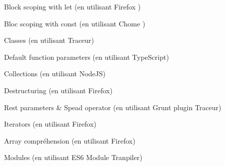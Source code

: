 \begin{list}{•}{•}
  
  \item 
  Block scoping with let (en utilisant Firefox )
  \item
  Bloc scoping with const (en utilisant Chome )
  \item
  Classes (en utilisant Traceur)
  \item
  Default function parameters (en utilisant TypeScript)
  \item
  Collections (en utilisant NodeJS)
  \item
  Destructuring (en utilisant Firefox)
  \item
  Rest parameters \& Spead operator (en utilisant Grunt plugin Traceur)
  \item
  Iterators (en utilisant Firefox)
  \item
  Array compréhension (en utilisant Firefox)
  \item
  Modules (en utilisant ES6 Module Tranpiler)

\end{list}



